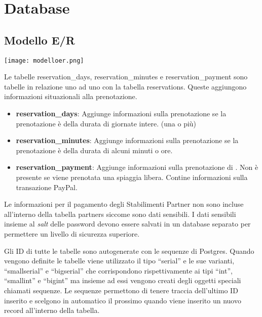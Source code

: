 \section{Database}

\subsection{Modello E/R}%
\label{sec:modelloer}

\texttt{[image: modelloer.png]}

Le tabelle reservation\_days, reservation\_minutes e reservation\_payment sono tabelle in relazione uno ad uno con la tabella reservations. Queste aggiungono informazioni situazionali alla prenotazione.

\begin{itemize}
    \item \textbf{reservation\_days}: Aggiunge informazioni sulla prenotazione se la prenotazione \`e della durata di giornate intere. (una o pi\`u)
    \item \textbf{reservation\_minutes}: Aggiunge informazioni sulla prenotazione se la prenotazione \`e della durata di alcuni minuti o ore.
    \item \textbf{reservation\_payment}: Aggiunge informazioni sulla prenotazione di . Non \`e presente se viene prenotata una spiaggia libera. Contine informazioni sulla transazione PayPal.
\end{itemize}

Le informazioni per il pagamento degli Stabilimenti Partner non sono incluse all'interno della tabella partners siccome sono dati sensibili. I dati sensibili insieme al \emph{salt} delle password devono essere salvati in un database separato per permettere un livello di sicurezza superiore.

Gli ID di tutte le tabelle sono autogenerate con le sequenze di Postgres. Quando vengono definite le tabelle viene utilizzato il tipo ``serial'' e le sue varianti, ``smallserial'' e ``bigserial'' che corrispondono rispettivamente ai tipi ``int'', ``smallint'' e ``bigint'' ma insieme ad essi vengono creati degli oggetti speciali chiamati sequenze. Le sequenze permettono di tenere traccia dell'ultimo ID inserito e scelgono in automatico il prossimo quando viene inserito un nuovo record all'interno della tabella.
